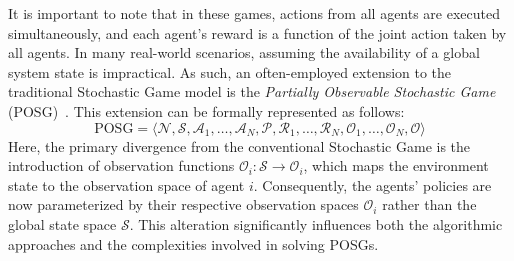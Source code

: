 It is important to note that in these games, 
 actions from all agents are executed simultaneously, 
 and each agent's reward is a function of the joint action taken by all agents. 
%
In many real-world scenarios, assuming the availability of a global system state is impractical. 
 As such, an often-employed extension to the traditional Stochastic Game model is the \emph{Partially Observable Stochastic Game} (POSG)~\cite{li2022zero}. 
 This extension can be formally represented as follows:
\begin{equation}
\text{POSG} = \langle \mathcal{N}, \mathcal{S}, \mathcal{A}_1, \ldots, \mathcal{A}_N, \mathcal{P}, \mathcal{R}_1, \ldots, \mathcal{R}_N, \mathcal{O}_1, \ldots, \mathcal{O}_N, \mathcal{O} \rangle
\end{equation}
Here, 
 the primary divergence from the conventional Stochastic Game 
 is the introduction of observation functions \(\mathcal{O}_i: \mathcal{S} \rightarrow \mathcal{O}_i\), 
 which maps the environment state to the observation space of agent \(i\). 
 Consequently, the agents' policies are now parameterized by their respective observation spaces \(\mathcal{O}_i\) rather than the global state space \(\mathcal{S}\). 
 This alteration significantly influences both the algorithmic approaches and the complexities involved in solving POSGs.
